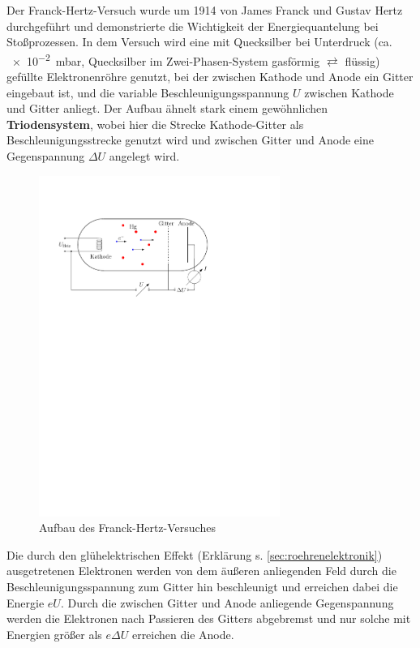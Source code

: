 \documentclass[11pt, a4paper]{article}
\begin{document}
Der Franck-Hertz-Versuch wurde um 1914 von James Franck und Gustav Hertz \cite{demtroeder3} durchgeführt und demonstrierte die Wichtigkeit der Energiequantelung bei Stoßprozessen.
In dem Versuch wird eine mit Quecksilber bei Unterdruck (ca. \SI{e-2}{\milli\bar}, Quecksilber im Zwei-Phasen-System gasförmig $\rightleftarrows$ flüssig) gefüllte Elektronenröhre genutzt, bei der zwischen Kathode und Anode ein Gitter eingebaut ist, und die variable Beschleunigungsspannung $U$ zwischen Kathode und Gitter anliegt.
Der Aufbau ähnelt stark einem gewöhnlichen \textbf{Triodensystem}, wobei hier die Strecke Kathode-Gitter als Beschleunigungsstrecke genutzt wird und zwischen Gitter und Anode eine Gegenspannung $\Delta U$ angelegt wird.
\begin{figure}[h]
\centering
\includegraphics[width=0.7\textwidth]{./figures/franck-hertz_aufbau.pdf}
\caption{Aufbau des Franck-Hertz-Versuches}
\label{fig:franck-hertz_aufbau}
\end{figure}
Die durch den glühelektrischen Effekt (Erklärung s. \ref{sec:roehrenelektronik}) ausgetretenen Elektronen werden von dem äußeren anliegenden Feld durch die Beschleunigungsspannung zum Gitter hin beschleunigt und erreichen dabei die Energie $eU$.
Durch die zwischen Gitter und Anode anliegende Gegenspannung werden die Elektronen nach Passieren des Gitters abgebremst und nur solche mit Energien größer als $e\Delta U$ erreichen die Anode.
\end{document}
